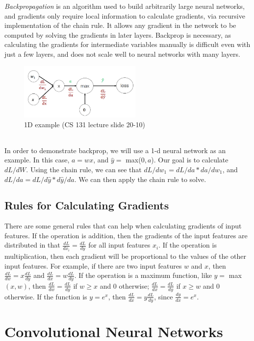 \documentclass{article}
\begin{document}
\textit{Backpropagation} is an algorithm used to build arbitrarily large neural networks, and gradients only require local information to calculate gradients, via recursive implementation of the chain rule. It allows any gradient in the network to be computed by solving the gradients in later layers. Backprop is necessary, as calculating the gradients for intermediate variables manually is difficult even with just a few layers, and does not scale well to neural networks with many layers. 
\\
\begin{figure}[h]
\includegraphics[width=6cm]{Capture.png}
\centering
\caption{1D example (CS 131 lecture slide 20-10)}
\end{figure}
 \\
In order to demonstrate backprop, we will use a 1-d neural network as an example. In this case, $a = wx$, and $\hat{y} =$ max($0,a$). Our goal is to calculate $dL/dW$. Using the chain rule, we can see that $dL/dw_1 = dL/da * da/dw_1$, and $dL/da = dL/d\hat{y} * d\hat{y}/da$. We can then apply the chain rule to solve.

\subsection{Rules for Calculating Gradients}

There are some general rules that can help when calculating gradients of input features. If the operation is addition, then the gradients of the input features are distributed in that $\frac{dL}{dx_i} = \frac{dL}{dy}$ for all input features $x_i$. If the operation is multiplication, then each gradient will be proportional to the values of the other input features. For example, if there are two input features $w$ and $x$, then $\frac{dL}{dw} = x\frac{dL}{dy}$ and $\frac{dL}{dx} = w\frac{dL}{dy}$. If the operation is a maximum function, like $y = $ max$(x, w)$, then $\frac{dL}{dw} = \frac{dL}{dy}$ if $w \geq x$ and 0 otherwise; $\frac{dL}{dx} = \frac{dL}{dy}$ if $x \geq w$ and 0 otherwise. If the function is $y = e^x$, then $\frac{dL}{dx} = y \frac{dL}{dy}$, since $\frac{dy}{dx} = e^x$.



\section{Convolutional Neural Networks}
\end{document}
